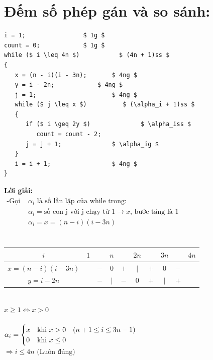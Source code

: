 \documentclass[12pt, letterpaper]{article}
\begin{document}
{{{\section{Đếm số phép gán và so sánh:}
\begin{lstlisting}
i = 1;			      $ 1g $
count = 0;		      $ 1g $
while ($ i \leq 4n $)		    $ (4n + 1)ss $
{
   x = (n - i)(i - 3n);       $ 4ng $
   y = i - 2n;		      $ 4ng $
   j = 1;                     $ 4ng $
   while ($ j \leq x $)		     $ (\alpha_i + 1)ss $
   {
      if ($ i \geq 2y $)      	      $ \alpha_iss $
         count = count - 2;
      j = j + 1;              $ \alpha_ig $
   }
   i = i + 1;        	      $ 4ng $
}
	\end{lstlisting}
	\textbf{Lời giải:} \\
	$ \begin{aligned}
		\text{-Gọi } & \alpha_i \text{ là số lần lặp của while trong:}                              \\
					& \alpha_i = \text{số con j với j chạy từ 1} \rightarrow x \text{, bước tăng là 1} \\
					& \alpha_i = x = (n-i)(i-3n) \\
	\end{aligned} $ \\
	 \\
	\begin{table}[htb]
		\begin{tabular}{c|c c c c c c c c c}
			$i$ & $1$ &  & $n$ &  & $2n$ &  & $3n$  & & $4n$\\
			\hline
			$x = (n-i)(i-3n)$ &  & $-$ & $0$ & $+$ & $\vert$ & $+$ & $0$ & $-$\\
			\hline
			$y = i - 2n$ &  & $-$ & $\vert$ & $-$ & $0$ & $+$ & $\vert$ & $+$\\
		\end{tabular}
	\end{table} \\
	 $x \geq 1 \Leftrightarrow x > 0$ \\ \\
	$\alpha_i =
	\begin{cases}
	x &\text{khi } x>0 \quad (n + 1 \leq i \leq 3n - 1)\\
	0 &\text{khi } x\leq 0
	\end{cases} \\$
	 \\
	$\Rightarrow i \leq 4n \text{ (Luôn đúng)}$\\
}}}
\end{document}
